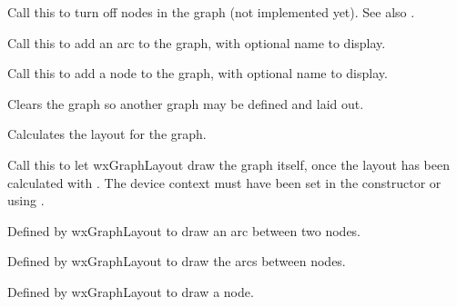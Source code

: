 Call this to turn off nodes in the graph (not implemented yet).
See also .

\label{addarc}


Call this to add an arc to the graph, with optional name to display.

\label{addnode}


Call this to add a node to the graph, with optional name to display.



Clears the graph so another graph may be defined and laid out.

\label{dolayout}


Calculates the layout for the graph.

\label{draw}


Call this to let wxGraphLayout draw the graph itself, once the layout has been
calculated with . The device context must
have been set in the constructor or using .



Defined by wxGraphLayout to draw an arc between two nodes.



Defined by wxGraphLayout to draw the arcs between nodes.



Defined by wxGraphLayout to draw a node.



